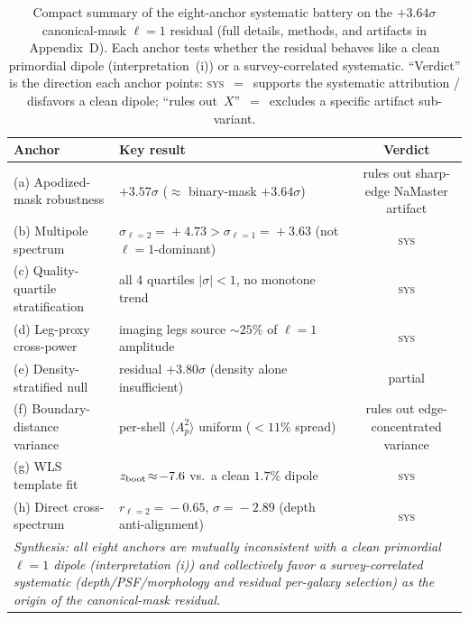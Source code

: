 \documentclass[aps,prd,twocolumn,superscriptaddress,preprintnumbers,nofootinbib,longbibliography,floatfix]{revtex4-2}
\newcommand{\sigmaunit}{\sigma}
\begin{document}
\begin{table}[t]
\caption{Compact summary of the eight-anchor systematic battery on the $+3.64\sigmaunit$ canonical-mask $\ell\!=\!1$ residual (full details, methods, and artifacts in Appendix~D). Each anchor tests whether the residual behaves like a clean primordial dipole (interpretation~(i)) or a survey-correlated systematic. ``Verdict'' is the direction each anchor points: \textsc{sys}~$=$~supports the systematic attribution / disfavors a clean dipole; ``rules out~$X$''~$=$~excludes a specific artifact sub-variant.\label{tab:eightanchor_summary}}
\begin{ruledtabular}
\begin{tabular}{llc}
\textbf{Anchor} & \textbf{Key result} & \textbf{Verdict} \\
\hline
(a) Apodized-mask robustness & $+3.57\sigmaunit$ ($\approx$ binary-mask $+3.64\sigmaunit$) & rules out sharp-edge NaMaster artifact \\
(b) Multipole spectrum & $\sigma_{\ell=2}\!=\!+4.73\!>\!\sigma_{\ell=1}\!=\!+3.63$ (not $\ell\!=\!1$-dominant) & \textsc{sys} \\
(c) Quality-quartile stratification & all 4 quartiles $|\sigma|\!<\!1$, no monotone trend & \textsc{sys} \\
(d) Leg-proxy cross-power & imaging legs source $\sim\!25\%$ of $\ell\!=\!1$ amplitude & \textsc{sys} \\
(e) Density-stratified null & residual $+3.80\sigmaunit$ (density alone insufficient) & partial \\
(f) Boundary-distance variance & per-shell $\langle A_p^2\rangle$ uniform ($<\!11\%$ spread) & rules out edge-concentrated variance \\
(g) WLS template fit & $z_{\rm boot}\!\approx\!-7.6$ vs.\ a clean $1.7\%$ dipole & \textsc{sys} \\
(h) Direct cross-spectrum & $r_{\ell=2}\!=\!-0.65$, $\sigma\!=\!-2.89$ (depth anti-alignment) & \textsc{sys} \\
\hline
\multicolumn{3}{p{0.95\textwidth}}{\emph{Synthesis: all eight anchors are mutually inconsistent with a clean primordial $\ell\!=\!1$ dipole (interpretation (i)) and collectively favor a survey-correlated systematic (depth/PSF/morphology and residual per-galaxy selection) as the origin of the canonical-mask residual.}} \\
\end{tabular}
\end{ruledtabular}
\end{table}
\end{document}
